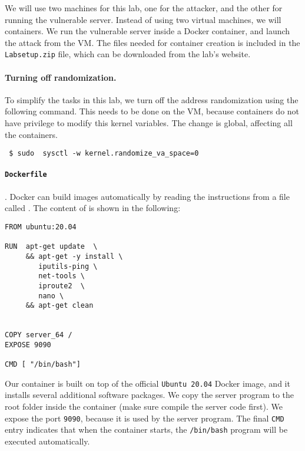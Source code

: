 We will use two machines for this lab, one for the attacker,
and the other for running the vulnerable server. Instead of 
using two virtual machines, we will containers. 
We run the vulnerable server inside a Docker container, and 
launch the attack from the VM. The files needed for 
container creation is included in the \texttt{Labsetup.zip}
file, which can be downloaded from the lab's website. 



\paragraph{Turning off randomization.} 
To simplify the tasks in this lab, we turn off the address randomization
using the following command. This needs to be done on the VM, because
containers do not have privilege to modify this kernel variables. 
The change is global, affecting all the containers. 

\begin{lstlisting}
 $ sudo  sysctl -w kernel.randomize_va_space=0
\end{lstlisting}



\paragraph{\texttt{Dockerfile}}. 
Docker can build images automatically by reading the instructions from a 
file called \dockerfile. 
The content of \dockerfile is shown in the following:

\begin{lstlisting}
FROM ubuntu:20.04
  
RUN  apt-get update  \
     && apt-get -y install \
        iputils-ping \
        net-tools \
        iproute2  \
        nano \
     && apt-get clean


COPY server_64 /
EXPOSE 9090

CMD [ "/bin/bash"]
\end{lstlisting}
 

Our container is built on top of the official \texttt{Ubuntu 20.04} Docker image,
and it installs several additional software packages. 
We copy the server program to the root folder inside the container (make sure 
compile the server code first). We expose the port \texttt{9090}, because
it is used by the server program. The final \texttt{CMD} entry
indicates that when the container starts, the \texttt{/bin/bash} program 
will be executed automatically. 


